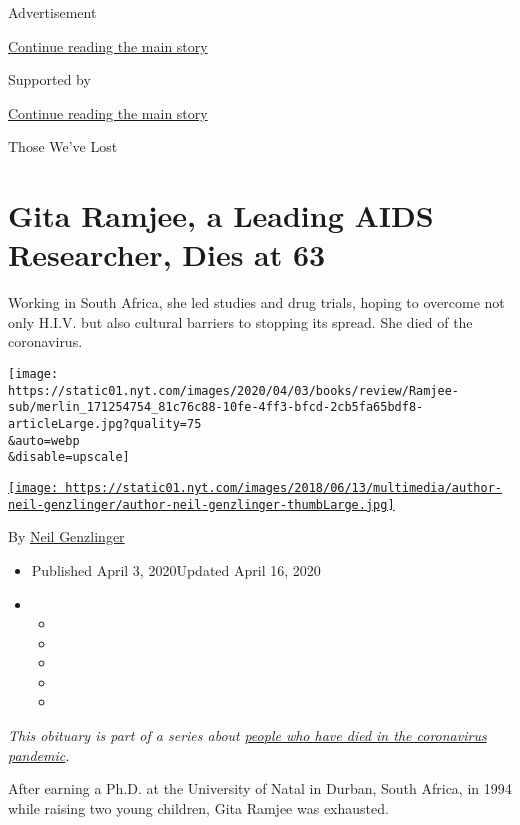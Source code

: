 Advertisement

\protect\hyperlink{after-top}{Continue reading the main story}

Supported by

\protect\hyperlink{after-sponsor}{Continue reading the main story}

Those We've Lost

\hypertarget{gita-ramjee-a-leading-aids-researcher-dies-at-63}{%
\section{Gita Ramjee, a Leading AIDS Researcher, Dies at
63}\label{gita-ramjee-a-leading-aids-researcher-dies-at-63}}

Working in South Africa, she led studies and drug trials, hoping to
overcome not only H.I.V. but also cultural barriers to stopping its
spread. She died of the coronavirus.

\texttt{[image: https://static01.nyt.com/images/2020/04/03/books/review/Ramjee-sub/merlin\_171254754\_81c76c88-10fe-4ff3-bfcd-2cb5fa65bdf8-articleLarge.jpg?quality=75\\\&auto=webp\\\&disable=upscale]}

\href{https://www.nytimes.com/by/neil-genzlinger}{\texttt{[image: https://static01.nyt.com/images/2018/06/13/multimedia/author-neil-genzlinger/author-neil-genzlinger-thumbLarge.jpg]}}

By \href{https://www.nytimes.com/by/neil-genzlinger}{Neil Genzlinger}

\begin{itemize}
\item
  Published April 3, 2020Updated April 16, 2020
\item
  \begin{itemize}
  \item
  \item
  \item
  \item
  \item
  \end{itemize}
\end{itemize}

\emph{This obituary is part of a series about}
\href{https://www.nytimes.com/series/people-who-have-died-of-the-coronavirus}{\emph{people
who have died in the coronavirus pandemic}}\emph{.}

After earning a Ph.D. at the University of Natal in Durban, South
Africa, in 1994 while raising two young children, Gita Ramjee was
exhausted.

